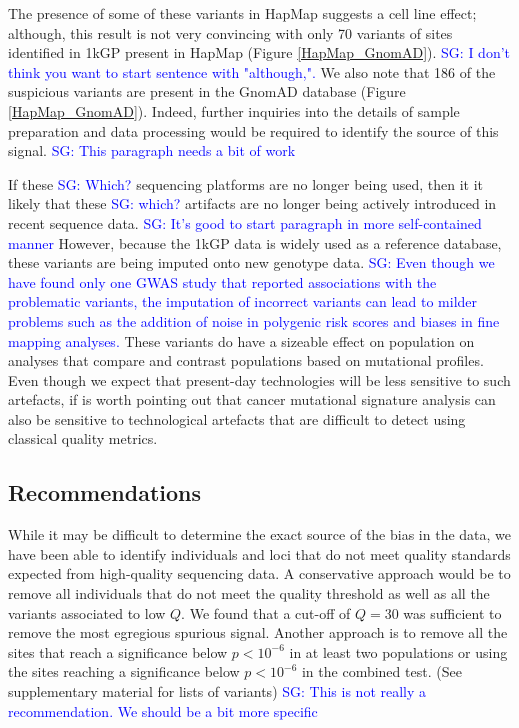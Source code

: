 \documentclass[9pt,lineno]{elife}
\newcommand{\sgcomment}[1]{\textcolor{blue}{SG: #1}}
\begin{document}
The presence of some of these variants in HapMap suggests a cell line effect; although, this result is not very convincing with only 70 variants of sites identified in 1kGP present in HapMap (Figure \ref{HapMap_GnomAD}). \sgcomment{I don't think you want to start sentence with "although,". }
We also note that 186 of the suspicious variants are present in the GnomAD database (Figure \ref{HapMap_GnomAD}).
Indeed, further inquiries into the details of sample preparation and data processing would be required to identify the source of this signal. \sgcomment{This paragraph needs a bit of work}

If these \sgcomment{Which?} sequencing platforms are no longer being used, then it it likely that these \sgcomment{which?} artifacts are no longer being actively introduced in recent sequence data. \sgcomment{It's good to start paragraph in more self-contained manner}
However, because the 1kGP data is widely used as a reference database, these variants are being imputed onto new genotype data.
\sgcomment{Even though we have found only one GWAS study that reported associations with the problematic variants, the imputation of incorrect variants can lead to milder problems such as the addition of noise in polygenic risk scores and biases in fine mapping analyses. }  
These variants do have a sizeable effect on population on analyses that compare and contrast populations based on mutational profiles. Even though we expect that present-day technologies will be less sensitive to such artefacts, if is worth pointing out that cancer mutational signature analysis can also be sensitive to technological artefacts that are difficult to detect using classical quality metrics. 


\subsection{Recommendations}
While it may be difficult to determine the exact source of the bias in the data, we have been able to identify individuals and loci that do not meet quality standards expected from high-quality sequencing data.
A conservative approach would be to remove all individuals that do not meet the quality threshold as well as all the variants associated to low $Q$.
We found that a cut-off of $Q = 30$ was sufficient to remove the most egregious spurious signal.
Another approach is to remove all the sites that reach a significance below $ p < 10^{-6}$ in at least two populations or using the sites reaching a significance below $ p < 10^{-6}$ in the combined test. (See supplementary material for lists of variants) \sgcomment{This is not really a recommendation. We should be a bit more specific}
\end{document}
